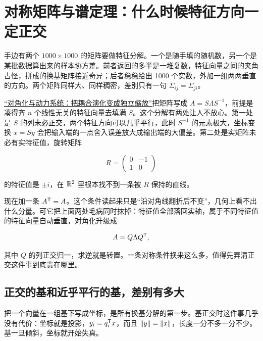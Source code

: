 \section{对称矩阵与谱定理：什么时候特征方向一定正交}
\label{sec:03-Linear-Algebra/06-Symmetric-and-Positive-Definite-Matrices/01}

手边有两个 \(1000\times1000\) 的矩阵要做特征分解。一个是随手填的随机数，另一个是某批数据算出来的样本协方差。前者返回的多半是一堆复数，特征向量之间的夹角古怪，拼成的换基矩阵接近奇异；后者稳稳给出 1000 个实数，外加一组两两垂直的方向。两个矩阵同样大、同样稠密，差别只有一句 \(\Sigma_{ij}=\Sigma_{ji}\)。

\hyperref[sec:03-Linear-Algebra/05-Eigenvalues-and-Eigenvectors/02]{``对角化与动力系统：把耦合演化变成独立缩放''}把矩阵写成 \(A=S\Lambda S^{-1}\)，前提是凑得齐 \(n\) 个线性无关的特征向量去填满 \(S\)。这个分解有两处让人不放心。第一处是 \(S\) 的列未必正交，两个特征方向可以几乎平行，此时 \(S^{-1}\) 的元素极大，坐标变换 \(x=Sy\) 会把输入端的一点舍入误差放大成输出端的大偏差。第二处是实矩阵未必有实特征值，旋转矩阵

\[
R=\begin{pmatrix}0&-1\\1&0\end{pmatrix}
\]

的特征值是 \(\pm i\)，在 \(\mathbb{R}^2\) 里根本找不到一条被 \(R\) 保持的直线。

现在加一条 \(A^{\mathsf{T}}=A\)。这个条件读起来只是``沿对角线翻折后不变''，几何上看不出什么分量。可它把上面两处毛病同时抹掉：特征值全部落回实轴，属于不同特征值的特征向量自动垂直，对角化升级成

\[
A=Q\Lambda Q^{\mathsf{T}},
\]

其中 \(Q\) 的列正交归一，求逆就是转置。一条对称条件换来这么多，值得先弄清正交这件事到底贵在哪里。

\subsection{正交的基和近乎平行的基，差别有多大}

把一个向量在一组基下写成坐标，是所有换基分解的第一步。基正交时这件事几乎没有代价：坐标就是投影，\(y_i=q_i^{\mathsf{T}}x\)，而且 \(\left\lVert y\right\rVert=\left\lVert x\right\rVert\)，长度一分不多一分不少。基一旦倾斜，坐标就开始失真。

